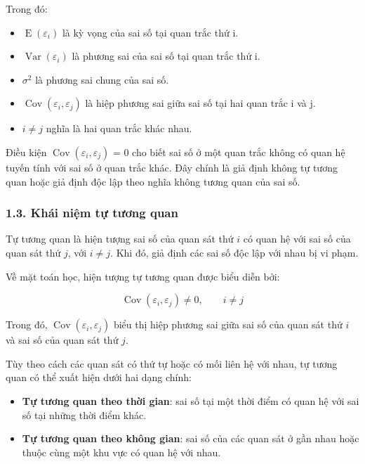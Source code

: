 Trong đó:

\begin{itemize}
\item
  \(\operatorname{E}(\varepsilon_i)\) là kỳ vọng của sai số tại quan trắc thứ i.
\item
  \(\operatorname{Var}(\varepsilon_i)\) là phương sai của sai số tại quan trắc thứ i.
\item
  \(\sigma^2\) là phương sai chung của sai số.
\item
  \(\operatorname{Cov}(\varepsilon_i,\varepsilon_j)\) là hiệp phương sai giữa sai số tại hai quan trắc i và j.
\item
  \(i\neq j\) nghĩa là hai quan trắc khác nhau.
\end{itemize}

Điều kiện \(\operatorname{Cov}(\varepsilon_i,\varepsilon_j)\) = 0 cho biết sai số ở một quan trắc không có quan
hệ tuyến tính với sai số ở quan trắc khác. Đây chính là giả định không
tự tương quan hoặc giả định độc lập theo nghĩa không tương quan của sai
số.

\subsubsection{1.3. Khái niệm tự tương quan}

Tự tương quan là hiện tượng sai số của quan sát thứ $i$ có quan hệ với sai số của quan sát thứ $j$, với $i \neq j$. Khi đó, giả định các sai số độc lập với nhau bị vi phạm.

Về mặt toán học, hiện tượng tự tương quan được biểu diễn bởi:

\[
\operatorname{Cov}(\varepsilon_i,\varepsilon_j) \neq 0,
\qquad i \neq j
\]

Trong đó, $\operatorname{Cov}(\varepsilon_i,\varepsilon_j)$ biểu thị hiệp phương sai giữa sai số của quan sát thứ $i$ và sai số của quan sát thứ $j$.

Tùy theo cách các quan sát có thứ tự hoặc có mối liên hệ với nhau, tự tương quan có thể xuất hiện dưới hai dạng chính:

\begin{itemize}
    \item \textbf{Tự tương quan theo thời gian}: sai số tại một thời điểm có quan hệ với sai số tại những thời điểm khác.
    
    \item \textbf{Tự tương quan theo không gian}: sai số của các quan sát ở gần nhau hoặc thuộc cùng một khu vực có quan hệ với nhau.
\end{itemize}

